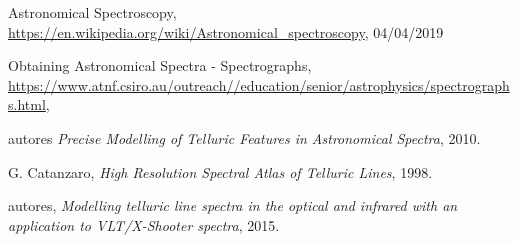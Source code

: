 \documentclass[11pt,twoside,a4paper]{article}
\begin{document}
\newpage
{}

\begin{thebibliography}{1}

     Astronomical Spectroscopy, \url{https://en.wikipedia.org/wiki/Astronomical_spectroscopy}, 04/04/2019
    
     Obtaining Astronomical Spectra - Spectrographs, \url{https://www.atnf.csiro.au/outreach//education/senior/astrophysics/spectrographs.html}, 

     autores {\em Precise Modelling of Telluric Features in Astronomical Spectra},  2010.
    
     G. Catanzaro, {\em High Resolution Spectral Atlas of Telluric Lines}, 1998.
    
     autores, {\em Modelling telluric line spectra in the optical and infrared with an application to VLT/X-Shooter spectra}, 2015.




  \end{thebibliography}

\end{document}
